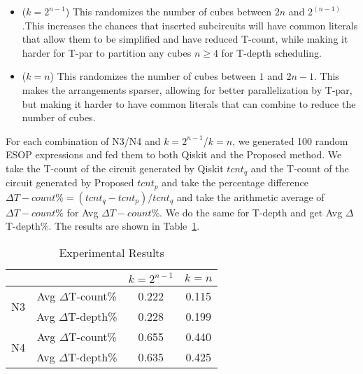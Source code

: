 \begin{itemize}
\item ($k=2^{n-1}$) This randomizes the number of cubes between $2n$ and $2^(n-1)$.This increases the chances
  that inserted subcircuits will have common literals that allow them to be simplified and have reduced T-count,
  while making it harder for T-par to partition any cubes $n \geq 4$ for T-depth scheduling.
\item ($k=n$) This randomizes the number of cubes between $1$ and $2n-1$. This makes the arrangements sparser,
  allowing for better parallelization by T-par, but making it harder to have common literals that can combine
  to reduce the number of cubes.
\end{itemize}

For each combination of N3/N4 and $k=2^{n-1}$/$k=n$, we generated 100 random ESOP expressions and fed them
to both Qiskit and the Proposed method. We take the T-count of the circuit generated by Qiskit $tcnt_q$ and
the T-count of the circuit generated by Proposed $tcnt_p$ and take the percentage difference
$\Delta T-count\% = (tcnt_q - tcnt_p) / tcnt_q$ and take the arithmetic average of $\Delta T-count\%$ for
Avg $\Delta T-count\%$. We do the same for T-depth and get Avg $\Delta$T-depth\%. The results are
shown in Table~\ref{table-results}.

\begin{table}[t]
  \begin{center}
    \scalebox{1.2} {
      \begin{tabular}{c|c|c|c}\hline
                            &                   & $k=2^{n-1}$ & $k=n$    \\\hline
        \multirow{2}{*}{N3} & Avg $\Delta$T-count\% &  0.222      & 0.115    \\\cline{2-4}
                            & Avg $\Delta$T-depth\% &  0.228      & 0.199    \\\hline
        \multirow{2}{*}{N4} & Avg $\Delta$T-count\% &  0.655      & 0.440    \\\cline{2-4}
                            & Avg $\Delta$T-depth\% &  0.635      & 0.425    \\\hline

      \end{tabular}        
    }
  \end{center}
  \caption{Experimental Results}
  \label{table-results}
  \vspace{-0.5cm}
\end{table}

